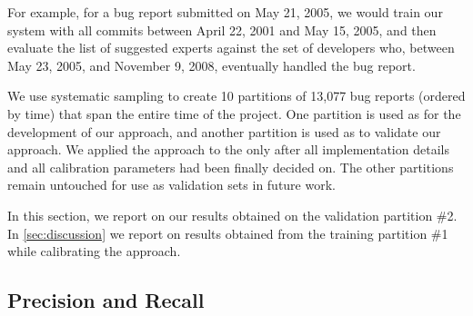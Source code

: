 For example, for a bug report submitted on May 21, 2005, we would train our system with all commits between April 22, 2001 and May 15, 2005, and then evaluate the list of suggested experts against the set of developers who, between May 23, 2005, and November 9, 2008, eventually handled the bug report.

We use systematic sampling to create 10 partitions of 13,077 bug reports (ordered by time) that span the entire time of the project. One partition is used as \trainingset for the development of our approach, and another partition is used as \validationset to validate our approach. We applied the approach to the \validationset only after all implementation details and all calibration parameters had been finally decided on. The other partitions remain untouched for use as validation sets in future work.

In this section, we report on our results obtained on the validation partition \#2. In \autoref{sec:discussion} we report on results obtained from the training partition \#1 while calibrating the approach.




\subsection{Precision and Recall}

